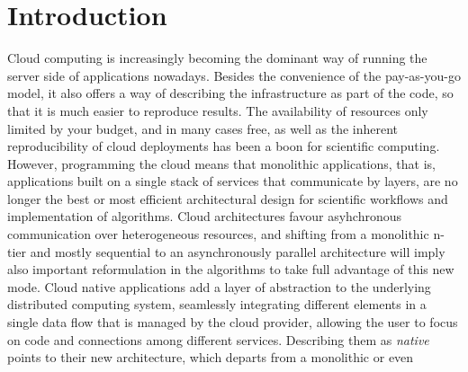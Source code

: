 \documentclass[sigconf]{acmart}
\begin{document}


\maketitle

\section{Introduction}

Cloud computing is increasingly becoming the dominant way of running
the server side of applications nowadays. Besides the convenience of the pay-as-you-go
model, it also offers a way of describing the infrastructure as part
of the code, so that it is much easier to reproduce results.
The availability of resources only limited by your budget, and in many
cases free, as well as the inherent reproducibility of cloud
deployments has been a boon for scientific computing. However,
programming the cloud means that monolithic applications, that is,
applications built on a single stack of services that communicate by
layers, are no longer the best or most efficient architectural design
for scientific workflows and implementation of algorithms. Cloud
architectures favour asyhchronous communication over heterogeneous
resources, and shifting from a monolithic n-tier and mostly sequential
to an asynchronously parallel architecture will imply also important
reformulation in the algorithms to take full advantage of this new mode.
  Cloud native applications add a layer of abstraction to the
  underlying distributed computing system, seamlessly integrating
  different elements in a single data flow that is managed by the
  cloud provider, allowing the user to focus on code and connections
  among different services. Describing them as {\em native} points
  to their new architecture, which departs from a monolithic or even
\end{document}
